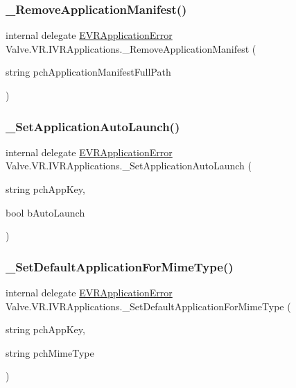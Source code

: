 \subsubsection{\texorpdfstring{\_RemoveApplicationManifest()}{\_RemoveApplicationManifest()}}
{\footnotesize\ttfamily internal delegate \mbox{\hyperlink{namespace_valve_1_1_v_r_a3488adab8a219b579fcee50f4e63a8b6}{E\+V\+R\+Application\+Error}} Valve.\+V\+R.\+I\+V\+R\+Applications.\+\_\+\+Remove\+Application\+Manifest (\begin{DoxyParamCaption}\item[{string}]{pch\+Application\+Manifest\+Full\+Path }\end{DoxyParamCaption})}

\mbox{\label{struct_valve_1_1_v_r_1_1_i_v_r_applications_acc22946329e6d33fc826a928d1087dfc}} 
\subsubsection{\texorpdfstring{\_SetApplicationAutoLaunch()}{\_SetApplicationAutoLaunch()}}
{\footnotesize\ttfamily internal delegate \mbox{\hyperlink{namespace_valve_1_1_v_r_a3488adab8a219b579fcee50f4e63a8b6}{E\+V\+R\+Application\+Error}} Valve.\+V\+R.\+I\+V\+R\+Applications.\+\_\+\+Set\+Application\+Auto\+Launch (\begin{DoxyParamCaption}\item[{string}]{pch\+App\+Key,  }\item[{bool}]{b\+Auto\+Launch }\end{DoxyParamCaption})}

\mbox{\label{struct_valve_1_1_v_r_1_1_i_v_r_applications_aa326d8a6ab208fa726df73e9b0fd9351}} 
\subsubsection{\texorpdfstring{\_SetDefaultApplicationForMimeType()}{\_SetDefaultApplicationForMimeType()}}
{\footnotesize\ttfamily internal delegate \mbox{\hyperlink{namespace_valve_1_1_v_r_a3488adab8a219b579fcee50f4e63a8b6}{E\+V\+R\+Application\+Error}} Valve.\+V\+R.\+I\+V\+R\+Applications.\+\_\+\+Set\+Default\+Application\+For\+Mime\+Type (\begin{DoxyParamCaption}\item[{string}]{pch\+App\+Key,  }\item[{string}]{pch\+Mime\+Type }\end{DoxyParamCaption})}




